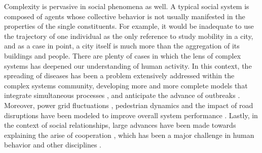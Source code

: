 Complexity is pervasive in social phenomena as well.  A typical social system is composed of agents whose collective behavior is not usually manifested in the properties of the single constituents. For example, it would be inadequate to use the trajectory of one individual as the only reference to study mobility in a city, and as a case in point, a city itself is much more than the aggregation of its buildings and people. There are plenty of cases in which the lens of complex systems has deepened our understanding of human activity. In this context, the spreading of diseases has been a problem extensively addressed within the complex systems community, developing more and more complete models that integrate simultaneous processes \cite{soriano2018spreading}, and anticipate the advance of outbreaks \cite{mazzoli2023spatial}. Moreover, power grid fluctuations \cite{martinez2023dynamical}, pedestrian dynamics \cite{zuriguel2020contact} and the impact of road disruptions have been modeled to improve overall system performance \cite{bassolas2020scaling}. Lastly, in the context of social relationships,  large advances have been made towards explaining the arise of cooperation \cite{axelrod1981evolution}, which has been a major challenge in human behavior and other disciplines \cite{Nowak2006EvolutionaryDynamics}.\\

